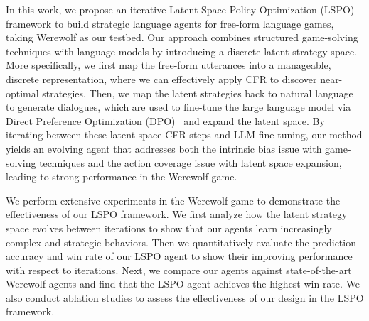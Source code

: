 In this work, we propose an iterative Latent Space Policy Optimization (LSPO) framework to build strategic language agents for free-form language games, taking Werewolf as our testbed. 
Our approach combines structured game-solving techniques with language models by introducing a discrete latent strategy space.
More specifically, we first map the free-form utterances into a manageable, discrete representation, where we can effectively apply CFR to discover near-optimal strategies. Then, we map the latent strategies back to natural language to generate dialogues, which are used to fine-tune the large language model via Direct Preference Optimization (DPO)~\cite{rafailov2024direct} and expand the latent space.
By iterating between these latent space CFR steps and LLM fine-tuning, our method yields an evolving agent that addresses both the intrinsic bias issue with game-solving techniques and the action coverage issue with latent space expansion, leading to strong performance in the Werewolf game.

We perform extensive experiments in the Werewolf game to demonstrate the effectiveness of our LSPO framework. We first analyze how the latent strategy space evolves between iterations to show that our agents learn increasingly complex and strategic behaviors. Then we quantitatively evaluate the prediction accuracy and win rate of our LSPO agent to show their improving performance with respect to iterations. Next, we compare our agents against state-of-the-art Werewolf agents and find that the LSPO agent achieves the highest win rate. We also conduct ablation studies to assess the effectiveness of our design in the LSPO framework.

